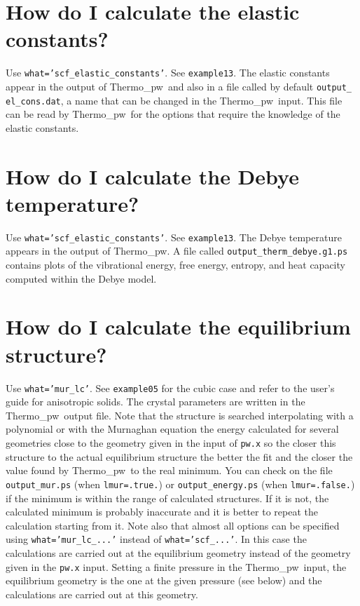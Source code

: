 \documentclass[12pt,a4paper,twoside]{report}
\def\thermo{{\sc Thermo}\_{\sc pw}}
\begin{document}
\newpage
{\color{coral}\section{How do I calculate the elastic constants?}}
\color{black}
Use \texttt{what='scf\_elastic\_constants'}. See \texttt{example13}. The
elastic constants appear in the output of \thermo\ and also in a file
called by default \texttt{output\_} \texttt{el\_cons.dat}, a name 
that can be changed in the \thermo\ input. This file can be read 
by \thermo\ for the options
that require the knowledge of the elastic constants.

\newpage
{\color{coral}\section{How do I calculate the Debye temperature?}}
\color{black}
Use \texttt{what='scf\_elastic\_constants'}. See \texttt{example13}. The
Debye temperature appears in the output of \thermo. A file called
\texttt{output\_therm\_debye.g1.ps} contains plots of the vibrational
energy, free energy, entropy, and heat capacity computed within the 
Debye model.

\newpage
{\color{coral}\section{How do I calculate the equilibrium structure?}}
\color{black}
Use \texttt{what='mur\_lc'}. See \texttt{example05} for the cubic case
and refer to the user's
guide for anisotropic solids. The crystal
parameters are written in the \thermo\ output file. Note that the structure is
searched interpolating with a polynomial or with the Murnaghan
equation the energy calculated for several geometries close to the geometry 
given in the input of \texttt{pw.x} so the closer this structure to the 
actual equilibrium structure the better the fit and the
closer the value found by \thermo\ to the real minimum. 
You can check on the file
\texttt{output\_mur.ps} (when \texttt{lmur=.true.}) or 
\texttt{output\_energy.ps} (when \texttt{lmur=.false.}) if the minimum
is within the range of calculated structures. If it is not, 
the calculated minimum is probably inaccurate and it is better to repeat the 
calculation starting from it.
Note also that almost all options can be specified using
\texttt{what='mur\_lc\_...'} instead of \texttt{what='scf\_...'}.
In this case the calculations are carried out at the equilibrium geometry 
instead of the geometry given in the \texttt{pw.x} input. 
Setting a finite pressure in the \thermo\ input, 
the equilibrium geometry is the one at the given pressure (see below)
and the calculations are carried out at this geometry.
\end{document}
